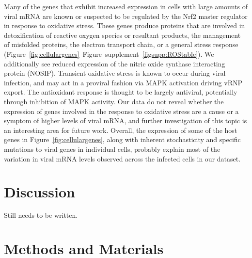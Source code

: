\documentclass[9pt,lineno]{elife}
\begin{document}
Many of the genes that exhibit increased expression in cells with large amounts of viral mRNA are known or suspected to be regulated by the Nrf2 master regulator in response to oxidative stress.
These genes produce proteins that are involved in detoxification of reactive oxygen species or resultant products, the management of misfolded proteins, the electron transport chain, or a general stress response (Figure~\ref{fig:cellulargenes}~Figure~supplement~\ref{figsupp:ROStable}). 
We additionally see reduced expression of the nitric oxide synthase interacting protein (NOSIP). 
Transient oxidative stress is known to occur during viral infection, and may act in a proviral fashion via MAPK activation driving vRNP export.
The antioxidant response is thought to be largely antiviral, potentially through inhibition of MAPK activity.
Our data do not reveal whether the expression of genes involved in the response to oxidative stress are a cause or a symptom of higher levels of viral mRNA, and further investigation of this topic is an interesting area for future work.
Overall, the expression of some of the host genes in Figure~\ref{fig:cellulargenes}, along with inherent stochasticity and specific mutations to viral genes in individual cells, probably explain most of the variation in viral mRNA levels observed across the infected cells in our dataset.

\section{Discussion}
Still needs to be written.

\section{Methods and Materials}
\end{document}
